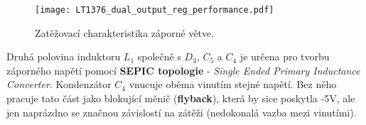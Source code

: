       \begin{figure}[ht!]
        \centering
        \texttt{[image: LT1376\_dual\_output\_reg\_performance.pdf]}
        \caption{Zatěžovací charakteristika záporné větve.}
        \label{enz:fig_LT1376_cir1_perform}
      \end{figure}

      Druhá polovina induktoru $L_1$ společně s $D_3$, $C_5$ a $C_4$ je určena pro tvorbu
      záporného napětí pomocí \textbf{SEPIC topologie} - \emph{Single Ended Primary Inductance
      Converter}. Kondenzátor $C_4$ vnucuje oběma vinutím stejné napětí. Bez něho pracuje tato
      část jako blokující měnič (\textbf{flyback}), která by sice poskytla -5V, ale jen naprázdno
      se značnou závislostí na zátěži (nedokonalá vazba mezi vinutími).

